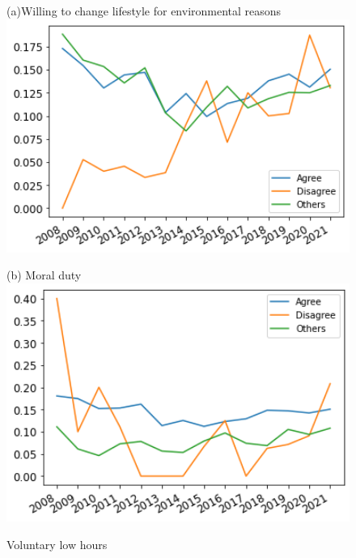 \documentclass[12pt]{article}
\begin{document}
\begin{figure}[h!!]
	\centering	
	\caption{Voluntary low hours }\label{fig:evolution_wtr_willingtochange}	
	\begin{minipage}[h!!]{0.32\textwidth}  
		\centering\footnotesize{(a)Willing to change lifestyle for environmental reasons}
		\includegraphics[width=1\textwidth]{../codding_data/results/liss/broad_groups_work_redcuctionqk20a175_actual.png}
	\end{minipage}
	\begin{minipage}[h!!]{0.32\textwidth}  
		\centering\footnotesize{(b) Moral duty}
		\includegraphics[width=1\textwidth]{../codding_data/results/liss/broad_groups_work_redcuctionqk20a183_actual.png}
	\end{minipage}
	\begin{minipage}[h!!]{0.32\textwidth}  

\end{minipage}
\end{figure}
\end{document}
